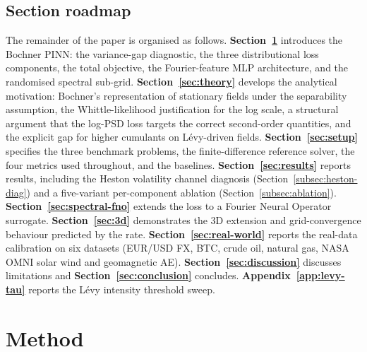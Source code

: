 \documentclass[review,12pt]{elsarticle}
\begin{document}
\subsection{Section roadmap}
\label{subsec:roadmap}

The remainder of the paper is organised as follows.
\textbf{Section~\ref{sec:method}} introduces the Bochner PINN: the
variance-gap diagnostic, the three distributional loss components,
the total objective, the Fourier-feature MLP architecture, and the
randomised spectral sub-grid.
\textbf{Section~\ref{sec:theory}} develops the analytical
motivation: Bochner's representation of stationary fields under the
separability assumption, the Whittle-likelihood justification for
the log scale, a structural argument that the log-PSD loss targets
the correct second-order quantities, and the explicit gap for
higher cumulants on L\'evy-driven fields.
\textbf{Section~\ref{sec:setup}} specifies the three benchmark
problems, the finite-difference reference solver, the four metrics
used throughout, and the baselines.
\textbf{Section~\ref{sec:results}} reports results, including the
Heston volatility channel diagnosis (Section~\ref{subsec:heston-diag})
and a five-variant per-component ablation
(Section~\ref{subsec:ablation}).
\textbf{Section~\ref{sec:spectral-fno}} extends the loss to a
Fourier Neural Operator surrogate.
\textbf{Section~\ref{sec:3d}} demonstrates the 3D extension and
grid-convergence behaviour predicted by the rate.
\textbf{Section~\ref{sec:real-world}} reports the real-data
calibration on six datasets (EUR/USD FX, BTC, crude oil, natural gas,
NASA OMNI solar wind and geomagnetic AE).
\textbf{Section~\ref{sec:discussion}} discusses limitations and
\textbf{Section~\ref{sec:conclusion}} concludes.
\textbf{Appendix~\ref{app:levy-tau}} reports the L\'evy intensity
threshold sweep.

\section{Method}
\label{sec:method}
\end{document}
